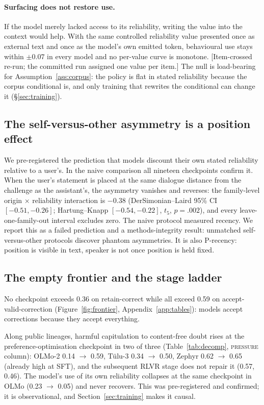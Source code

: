 \documentclass{article}
\newcommand{\pending}[1]{\textcolor{blue!70!black}{[#1]}}
\begin{document}
\paragraph{Surfacing does not restore use.} If the model merely lacked access to its reliability, writing the value into the context would help. With the same controlled reliability value presented once as external text and once as the model's own emitted token, behavioural use stays within $\pm0.07$ in every model and no per-value curve is monotone. \pending{Item-crossed re-run; the committed run assigned one value per item.} The null is load-bearing for Assumption~\ref{ass:corpus}: the policy is flat in stated reliability because the corpus conditional is, and only training that rewrites the conditional can change it (\S\ref{sec:training}).

\subsection{The self-versus-other asymmetry is a position effect}
We pre-registered the prediction that models discount their own stated reliability relative to a user's. In the naive comparison all nineteen checkpoints confirm it. When the user's statement is placed at the same dialogue distance from the challenge as the assistant's, the asymmetry vanishes and reverses: the family-level origin $\times$ reliability interaction is $-0.38$ (DerSimonian--Laird 95\% CI $[-0.51,-0.26]$; Hartung--Knapp $[-0.54,-0.22]$, $t_5$, $p=.002$), and every leave-one-family-out interval excludes zero. The naive protocol measured recency. We report this as a failed prediction and a methods-integrity result: unmatched self-versus-other protocols discover phantom asymmetries. It is also P-recency: position is visible in text, speaker is not once position is held fixed.

\subsection{The empty frontier and the stage ladder}
No checkpoint exceeds 0.36 on retain-correct while all exceed 0.59 on accept-valid-correction (Figure~\ref{fig:frontier}, Appendix~\ref{app:tables}): models accept corrections because they accept everything. 

Along public lineages, harmful capitulation to content-free doubt rises at the preference-optimisation checkpoint in two of three (Table~\ref{tab:decomp}, \textsc{pressure} column): OLMo-2 0.14 $\to$ 0.59, T\"ulu-3 0.34 $\to$ 0.50, Zephyr 0.62 $\to$ 0.65 (already high at SFT), and the subsequent RLVR stage does not repair it (0.57, 0.46). The model's use of its own reliability collapses at the same checkpoint in OLMo (0.23 $\to$ 0.05) and never recovers. This was pre-registered and confirmed; it is observational, and Section~\ref{sec:training} makes it causal.
\end{document}
